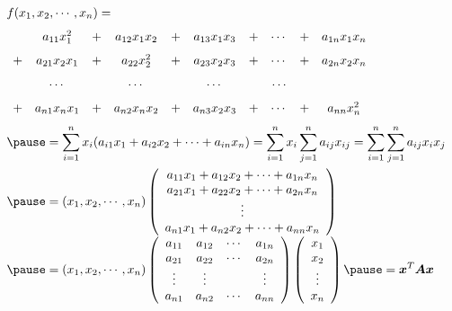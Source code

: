 \begin{frame}
  
    $$
    \begin{array}{l}
      f(x_1,x_2,\cd,x_n) =  \\[0.1in]
      \begin{array}{rcccccccccc}
        &a_{11}x_1^2&+&a_{12}x_1x_2&+&a_{13}x_1x_3&+&\cd&+&a_{1n}x_1x_n\\[0.1in]
        +&a_{21}x_2x_1&+&a_{22}x_2^2&+&a_{23}x_2x_3&+&\cd&+&a_{2n}x_2x_n\\[0.1in]
        &\cd&&\cd&&\cd&&\cd\\[0.1in]
        +&a_{n1}x_nx_1&+&a_{n2}x_nx_2&+&a_{n3}x_2x_3&+&\cd&+&a_{nn}x_n^2
      \end{array} \\[0.5in] \pause
      \ds = \sum_{i=1}^nx_i(a_{i1}x_1+a_{i2}x_2+\cd+a_{in}x_n)
      \ds = \sum_{i=1}^nx_i\sum_{j=1}^n a_{ij}x_{ij}
      \ds = \sum_{i=1}^n\sum_{j=1}^na_{ij}x_ix_j\\[0.2in] \pause
      \ds = (x_1,x_2,\cd,x_n)\left(
      \begin{array}{c}
        a_{11}x_1+a_{12}x_2+\cd+a_{1n}x_n\\
        a_{21}x_1+a_{22}x_2+\cd+a_{2n}x_n\\
        \vd\\
        a_{n1}x_1+a_{n2}x_2+\cd+a_{nn}x_n
      \end{array}
      \right)\\[0.3in]\pause
      \ds = (x_1,x_2,\cd,x_n)\left(
      \begin{array}{cccc}
        a_{11}&a_{12}&\cd&a_{1n}\\
        a_{21}&a_{22}&\cd&a_{2n}\\
        \vd&\vd&&\vd\\
        a_{n1}&a_{n2}&\cd&a_{nn}\\
      \end{array}
      \right)\left(
      \begin{array}{c}
        x_1\\
        x_2\\
        \vd\\
        x_n
      \end{array}\right) \pause = \vx^T\MA\vx
    \end{array}
    $$
  
\end{frame}


